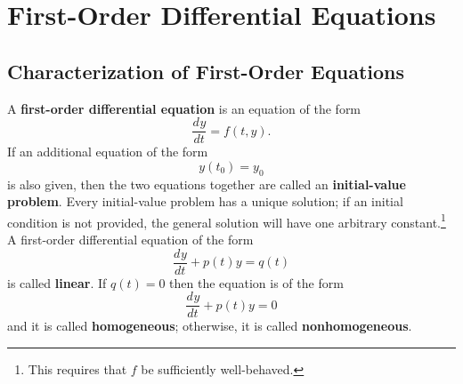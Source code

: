 \documentclass{myart}
\newcommand{\term}[1]{\textbf{#1}}
\newcommand{\deriv}[3][]{\frac{d^{#1}#2}{d#3^{#1}}}
\begin{document}

\tableofcontents

\section{First-Order Differential Equations} \label{sec:first order}

\subsection{Characterization of First-Order Equations} \label{subsec:first order characterization}

A \term{first-order differential equation} is an equation of the form
\begin{equation*}
\deriv{y}{t} = f(t, y).
\end{equation*}
If an additional equation of the form
\begin{equation*}
y(t_0) = y_0
\end{equation*}
is also given, then the two equations together are called an \term{initial-value problem}. Every initial-value problem has a unique solution; if an initial condition is not provided, the general solution will have one arbitrary constant.\footnote{This requires that $f$ be sufficiently well-behaved.} A first-order differential equation of the form
\begin{equation} \label{eq:first order nonhomogeneous}
\deriv{y}{t} + p(t)y = q(t)
\end{equation}
is called \term{linear}. If $q(t) = 0$ then the equation is of the form
\begin{equation} \label{eq:first order homogeneous}
\deriv{y}{t} + p(t)y = 0
\end{equation}
and it is called \term{homogeneous}; otherwise, it is called \term{nonhomogeneous}.
\end{document}
